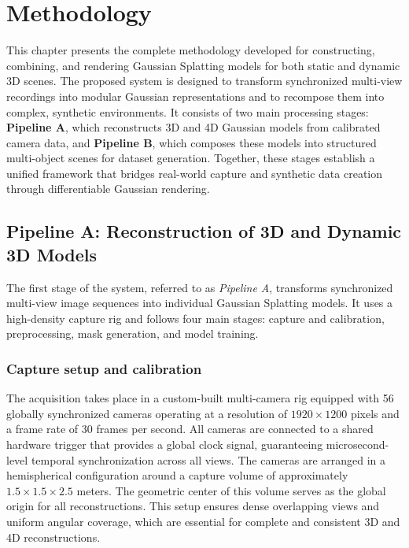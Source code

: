 \chapter{Methodology}

This chapter presents the complete methodology developed for constructing, combining, and rendering Gaussian Splatting models for both static and dynamic 3D scenes. 
The proposed system is designed to transform synchronized multi-view recordings into modular Gaussian representations and to recompose them into complex, synthetic environments. 
It consists of two main processing stages: \textbf{Pipeline A}, which reconstructs 3D and 4D Gaussian models from calibrated camera data, and \textbf{Pipeline B}, which composes these models into structured multi-object scenes for dataset generation. 
Together, these stages establish a unified framework that bridges real-world capture and synthetic data creation through differentiable Gaussian rendering.

\section{Pipeline A: Reconstruction of 3D and Dynamic 3D Models}

The first stage of the system, referred to as \emph{Pipeline A}, transforms synchronized multi-view image sequences into individual Gaussian Splatting models. It uses a high-density capture rig and follows four main stages: capture and calibration, preprocessing, mask generation, and model training.

\subsection{Capture setup and calibration}
The acquisition takes place in a custom-built multi-camera rig equipped with 56 globally synchronized cameras operating at a resolution of \(1920 \times 1200\) pixels and a frame rate of 30 frames per second. 
All cameras are connected to a shared hardware trigger that provides a global clock signal, guaranteeing microsecond-level temporal synchronization across all views.
The cameras are arranged in a hemispherical configuration around a capture volume of approximately \(1.5 \times 1.5 \times 2.5\) meters.
The geometric center of this volume serves as the global origin for all reconstructions.
This setup ensures dense overlapping views and uniform angular coverage, which are essential for complete and consistent 3D and 4D reconstructions.

